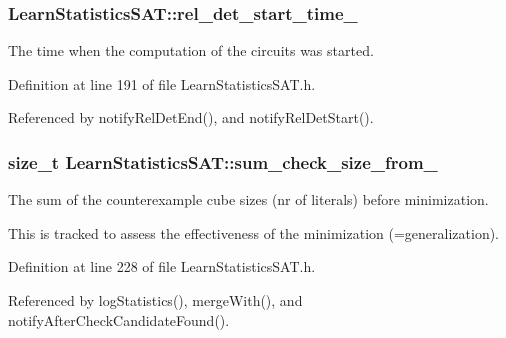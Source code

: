 \hypertarget{classLearnStatisticsSAT_af02bb7ecbdb583b8c49191581dcbe607}{
\subsubsection[{rel\-\_\-det\-\_\-start\-\_\-time\-\_\-}]{ Learn\-Statistics\-S\-A\-T\-::rel\-\_\-det\-\_\-start\-\_\-time\-\_\-\hspace{0.3cm}{\ttfamily [protected]}}}\label{classLearnStatisticsSAT_af02bb7ecbdb583b8c49191581dcbe607}


The time when the computation of the circuits was started. 



Definition at line 191 of file Learn\-Statistics\-S\-A\-T.\-h.



Referenced by notify\-Rel\-Det\-End(), and notify\-Rel\-Det\-Start().

\hypertarget{classLearnStatisticsSAT_a2d6735aa7c84c50967b3bb779d2a0a86}{
\subsubsection[{sum\-\_\-check\-\_\-size\-\_\-from\-\_\-}]{\setlength{\rightskip}{0pt plus 5cm}size\-\_\-t Learn\-Statistics\-S\-A\-T\-::sum\-\_\-check\-\_\-size\-\_\-from\-\_\-\hspace{0.3cm}{\ttfamily [protected]}}}\label{classLearnStatisticsSAT_a2d6735aa7c84c50967b3bb779d2a0a86}


The sum of the counterexample cube sizes (nr of literals) before minimization. 

This is tracked to assess the effectiveness of the minimization (=generalization). 

Definition at line 228 of file Learn\-Statistics\-S\-A\-T.\-h.



Referenced by log\-Statistics(), merge\-With(), and notify\-After\-Check\-Candidate\-Found().

